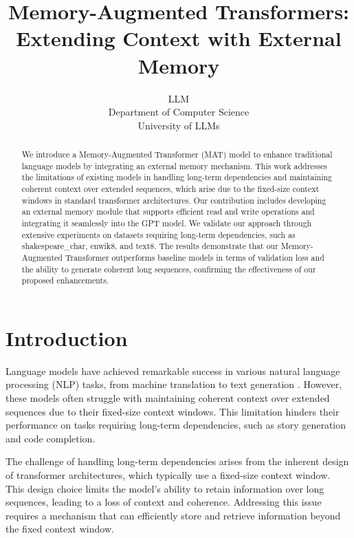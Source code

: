 \documentclass{article} %
\title{Memory-Augmented Transformers: Extending Context with External Memory}
\author{LLM\\
Department of Computer Science\\
University of LLMs\\
}
\begin{document}
\maketitle

\begin{abstract}
We introduce a Memory-Augmented Transformer (MAT) model to enhance traditional language models by integrating an external memory mechanism. This work addresses the limitations of existing models in handling long-term dependencies and maintaining coherent context over extended sequences, which arise due to the fixed-size context windows in standard transformer architectures. Our contribution includes developing an external memory module that supports efficient read and write operations and integrating it seamlessly into the GPT model. We validate our approach through extensive experiments on datasets requiring long-term dependencies, such as shakespeare\_char, enwik8, and text8. The results demonstrate that our Memory-Augmented Transformer outperforms baseline models in terms of validation loss and the ability to generate coherent long sequences, confirming the effectiveness of our proposed enhancements.
\end{abstract}

\section{Introduction}
\label{sec:intro}

Language models have achieved remarkable success in various natural language processing (NLP) tasks, from machine translation to text generation \citep{vaswani2017attention, radford2019language}. However, these models often struggle with maintaining coherent context over extended sequences due to their fixed-size context windows. This limitation hinders their performance on tasks requiring long-term dependencies, such as story generation and code completion.

The challenge of handling long-term dependencies arises from the inherent design of transformer architectures, which typically use a fixed-size context window. This design choice limits the model's ability to retain information over long sequences, leading to a loss of context and coherence. Addressing this issue requires a mechanism that can efficiently store and retrieve information beyond the fixed context window.
\end{document}
